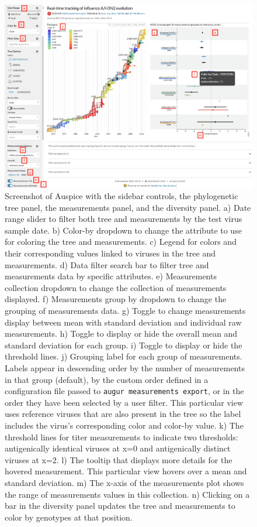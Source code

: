 \documentclass[utf8]{FrontiersinHarvard} %
\begin{document}
\begin{figure}[h!]
  \begin{center}
    \includegraphics[width=\textwidth]{figures/figure-2-screen-shot}
  \end{center}
  \caption{
    Screenshot of Auspice with the sidebar controls, the phylogenetic tree panel, the measurements panel, and the diversity panel.
a) Date range slider to filter both tree and measurements by the test virus sample date.
b) Color-by dropdown to change the attribute to use for coloring the tree and measurements.
c) Legend for colors and their corresponding values linked to viruses in the tree and measurements.
d) Data filter search bar to filter tree and measurements data by specific attributes.
e) Measurements collection dropdown to change the collection of measurements displayed.
f) Measurements group by dropdown to change the grouping of measurements data.
g) Toggle to change measurements display between mean with standard deviation and individual raw measurements.
h) Toggle to display or hide the overall mean and standard deviation for each group.
i) Toggle to display or hide the threshold lines.
j) Grouping label for each group of measurements.
Labels appear in descending order by the number of measurements in that group (default), by the custom order defined in a configuration file passed to \texttt{augur measurements export}, or in the order they have been selected by a user filter.
This particular view uses reference viruses that are also present in the tree so the label includes the virus's corresponding color and color-by value.
k) The threshold lines for titer measurements to indicate two thresholds: antigenically identical viruses at x=0 and antigenically distinct viruses at x=2.
l) The tooltip that displays more details for the hovered measurement.
This particular view hovers over a mean and standard deviation.
m) The x-axis of the measurements plot shows the range of measurements values in this collection.
n) Clicking on a bar in the diversity panel updates the tree and measurements to color by genotypes at that position.
  }\label{fig:2}
\end{figure}
\end{document}
